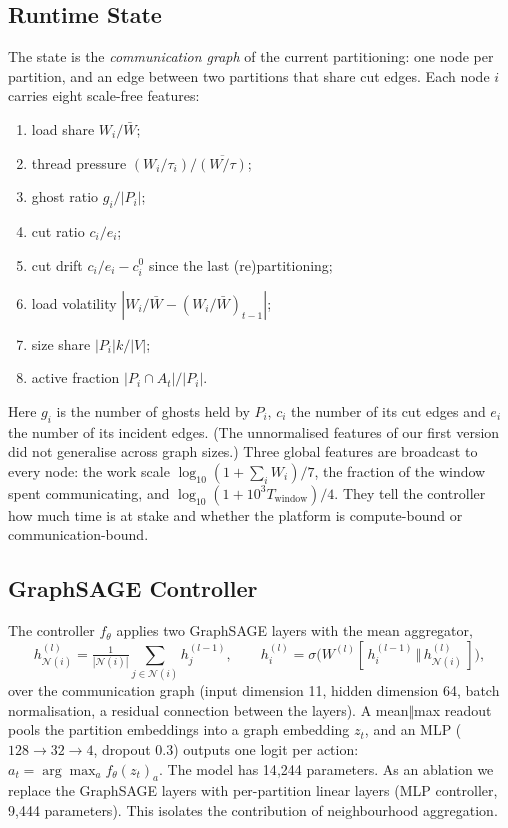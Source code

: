\subsection{Runtime State}
The state is the \emph{communication graph} of the current partitioning: one node per
partition, and an edge between two partitions that share cut edges. Each node $i$ carries
eight scale-free features:
\begin{enumerate}
  \item load share $W_i/\bar W$;
  \item thread pressure $(W_i/\tau_i)/\overline{(W/\tau)}$;
  \item ghost ratio $g_i/|P_i|$;
  \item cut ratio $c_i/e_i$;
  \item cut drift $c_i/e_i-c^0_i$ since the last (re)partitioning;
  \item load volatility $|W_i/\bar W-(W_i/\bar W)_{t-1}|$;
  \item size share $|P_i|k/|V|$;
  \item active fraction $|P_i\cap A_t|/|P_i|$.
\end{enumerate}
Here $g_i$ is the number of ghosts held by $P_i$, $c_i$ the number of its cut edges and $e_i$
the number of its incident edges. (The unnormalised features of our first version did not
generalise across graph sizes.) Three global features are broadcast to every node: the work
scale $\log_{10}(1+\sum_i W_i)/7$, the fraction of the window spent communicating, and
$\log_{10}(1+10^3 T_{\mathrm{window}})/4$. They tell the controller how much time is at stake
and whether the platform is compute-bound or communication-bound.

\subsection{GraphSAGE Controller}
The controller $f_\theta$ applies two GraphSAGE layers \cite{hamilton2017graphsage} with the
mean aggregator,
\begin{equation}
  h^{(l)}_{\mathcal{N}(i)} = \tfrac{1}{|\mathcal{N}(i)|}\textstyle\sum_{j\in\mathcal{N}(i)} h^{(l-1)}_j, \qquad
  h^{(l)}_i = \sigma\big(W^{(l)}[\,h^{(l-1)}_i \,\Vert\, h^{(l)}_{\mathcal{N}(i)}\,]\big),
\end{equation}
over the communication graph (input dimension 11, hidden dimension 64, batch normalisation,
a residual connection between the layers). A mean$\Vert$max readout pools the partition
embeddings into a graph embedding $z_t$, and an MLP ($128\!\to\!32\!\to\!4$, dropout 0.3) outputs
one logit per action: $a_t=\arg\max_a f_\theta(z_t)_a$. The model has 14{,}244 parameters.
As an ablation we replace the GraphSAGE layers with per-partition linear layers (MLP
controller, 9{,}444 parameters). This isolates the contribution of neighbourhood aggregation.

